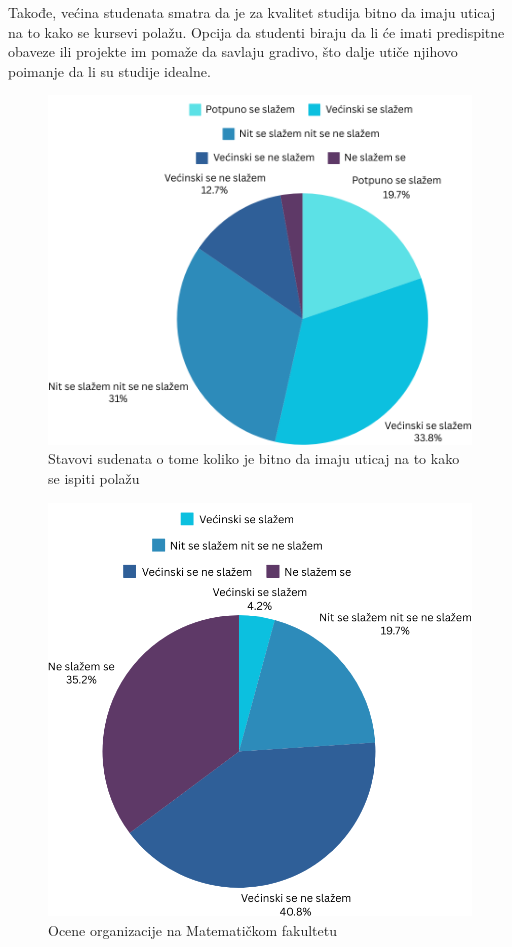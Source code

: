 \documentclass[a4paper]{article}
\begin{document}
{Takođe, većina studenata smatra da je za kvalitet studija bitno da imaju uticaj na to kako se kursevi polažu. Opcija da studenti biraju da li će imati predispitne obaveze ili projekte im pomaže da savlaju gradivo, što dalje utiče njihovo poimanje da li su studije idealne.
\begin{figure}[h!]
\begin{center}
    \includegraphics[scale = 0.3]{PieChartUticajNaPolaganje.png}
    \caption{Stavovi sudenata o tome koliko je bitno da imaju uticaj na to kako se ispiti polažu}
    \label{fig:uticaj}
\end{center}
\end{figure}


\begin{figure}[h!]
\begin{center}
    \includegraphics[scale = 0.3]{PieChartOrganizacijaMatf.png}
    \caption{Ocene organizacije na Matematičkom fakultetu}
    \label{fig:organizacija_matf}
\end{center}
\end{figure}

}
\end{document}
